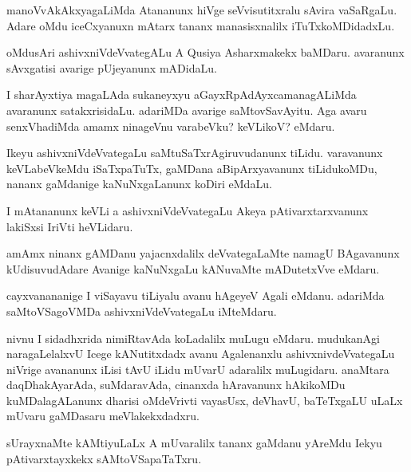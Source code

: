 \documentclass{article}
\begin{document}
\begin{mn}%
manoVvAkAkxyagaLiMda Atananunx hiVge seVvisutitxralu sAvira vaSaRgaLu. Adare oMdu 
iceCxyanuxn mAtarx tananx manasisxnalilx iTuTxkoMDidadxLu.
\end{mn}

\begin{mn}%
oMdusAri ashivxniVdeVvategALu A Qusiya Asharxmakekx baMDaru. avaranunx sAvxgatisi avarige 
pUjeyanunx mADidaLu.
\end{mn}

\begin{mn}%
I sharAyxtiya magaLAda sukaneyxyu aGayxRpAdAyxcamanagALiMda avaranunx satakxrisidaLu. 
adariMDa avarige saMtovSavAyitu. Aga avaru senxVhadiMda amamx ninageVnu varabeVku? keVLikoV?
eMdaru.
\end{mn}

\begin{mn}%
Ikeyu ashivxniVdeVvategaLu saMtuSaTxrAgiruvudanunx tiLidu. varavanunx keVLabeVkeMdu 
iSaTxpaTuTx, gaMDana aBipArxyavanunx tiLidukoMDu, nananx gaMdanige kaNuNxgaLanunx koDiri 
eMdaLu.
\end{mn}

\begin{mn}%
I mAtananunx keVLi a ashivxniVdeVvategaLu Akeya pAtivarxtarxvanunx lakiSxsi IriVti heVLidaru.
\end{mn}

\begin{mn}%
amAmx ninanx gAMDanu yajacnxdalilx deVvategaLaMte namagU BAgavanunx kUdisuvudAdare Avanige 
kaNuNxgaLu kANuvaMte mADutetxVve eMdaru.
\end{mn}

\begin{mn}%
cayxvanananige I viSayavu tiLiyalu avanu hAgeyeV Agali eMdanu. adariMda saMtoVSagoVMDa 
ashivxniVdeVvategaLu iMteMdaru.
\end{mn}

\begin{mn}%
nivnu I sidadhxrida nimiRtavAda koLadalilx muLugu eMdaru. mudukanAgi naragaLelalxvU Icege 
kANutitxdadx avanu Agalenanxlu ashivxnivdeVvategaLu niVrige avananunx iLisi tAvU iLidu 
mUvarU adaralilx muLugidaru. anaMtara daqDhakAyarAda, suMdaravAda, cinanxda hAravanunx 
hAkikoMDu kuMDalagALanunx dharisi oMdeVrivti vayasUsx, deVhavU, baTeTxgaLU uLaLx mUvaru 
gaMDasaru meVlakekxdadxru.
\end{mn}

\begin{mn}%
sUrayxnaMte kAMtiyuLaLx A mUvaralilx tananx gaMdanu yAreMdu Iekyu pAtivarxtayxkekx 
sAMtoVSapaTaTxru.
\end{mn}
\end{document}
